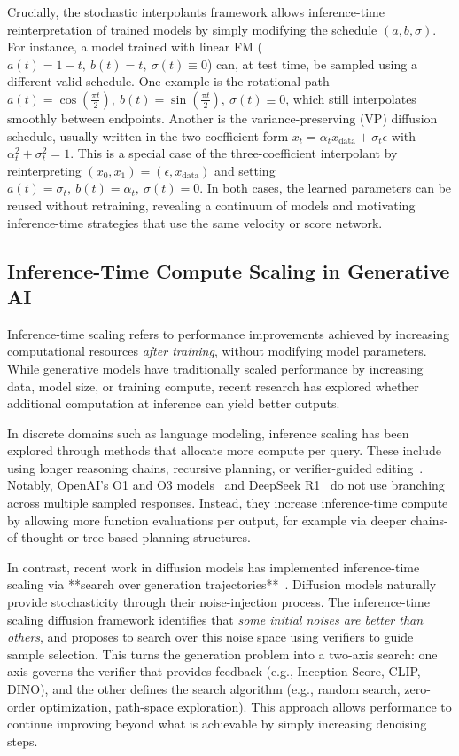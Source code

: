 \documentclass{article}
\begin{document}
Crucially, the stochastic interpolants framework allows inference-time reinterpretation of trained
models by simply modifying the schedule $(a,b,\sigma)$. For instance, a model trained with linear FM
($a(t)=1-t,\ b(t)=t,\ \sigma(t)\equiv 0$) can, at test time, be sampled using a different valid
schedule. One example is the rotational path
$a(t)=\cos(\tfrac{\pi t}{2}),\ b(t)=\sin(\tfrac{\pi t}{2}),\ \sigma(t)\equiv 0$,
which still interpolates smoothly between endpoints.
Another is the variance-preserving (VP) diffusion schedule, usually written in the two-coefficient
form $x_t=\alpha_t x_{\mathrm{data}}+\sigma_t \epsilon$ with $\alpha_t^2+\sigma_t^2=1$.
This is a special case of the three-coefficient interpolant by reinterpreting $(x_0,x_1)=(\epsilon,
x_{\mathrm{data}})$ and setting $a(t)=\sigma_t,\ b(t)=\alpha_t,\ \sigma(t)=0$.
In both cases, the learned parameters can be reused without retraining, revealing a continuum of
models and motivating inference-time strategies that use the same velocity or score network.

\subsection{Inference-Time Compute Scaling in Generative AI}

Inference-time scaling refers to performance improvements achieved by increasing computational resources \emph{after training}, without modifying model parameters. While generative models have traditionally scaled performance by increasing data, model size, or training compute, recent research has explored whether additional computation at inference can yield better outputs.

In discrete domains such as language modeling, inference scaling has been explored through methods that allocate more compute per query. These include using longer reasoning chains, recursive planning, or verifier-guided editing~\cite{gandhi2024sos, cobbe2021verifiers, lightman2023verify, brown2024llmmonkeys}. Notably, OpenAI's O1 and O3 models~\cite{openai2024o1} and DeepSeek R1~\cite{deepseek2024r1} do not use branching across multiple sampled responses. Instead, they increase inference-time compute by allowing more function evaluations per output, for example via deeper chains-of-thought or tree-based planning structures.

In contrast, recent work in diffusion models has implemented inference-time scaling via **search over generation trajectories**~\cite{ma2025diffits}. Diffusion models naturally provide stochasticity through their noise-injection process. The inference-time scaling diffusion framework identifies that \emph{some initial noises are better than others}, and proposes to search over this noise space using verifiers to guide sample selection. This turns the generation problem into a two-axis search: one axis governs the verifier that provides feedback (e.g., Inception Score, CLIP, DINO), and the other defines the search algorithm (e.g., random search, zero-order optimization, path-space exploration). This approach allows performance to continue improving beyond what is achievable by simply increasing denoising steps.
\end{document}
